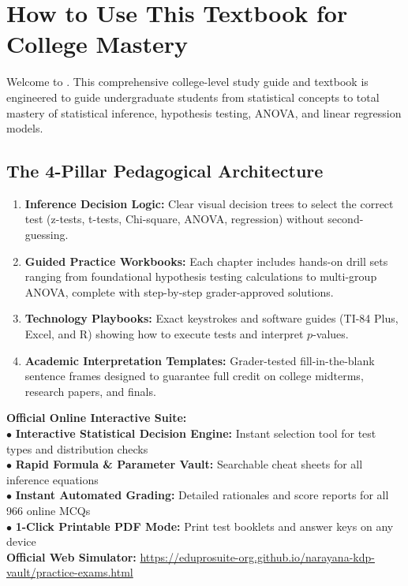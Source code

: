 \tableofcontents
\clearpage

\chapter*{How to Use This Textbook for College Mastery}

Welcome to \textbf{\BookTitle}. This comprehensive college-level study guide and textbook is engineered to guide undergraduate students from statistical concepts to total mastery of statistical inference, hypothesis testing, ANOVA, and linear regression models.

\section*{The 4-Pillar Pedagogical Architecture}
\begin{enumerate}[leftmargin=1.5em]
  \item \textbf{Inference Decision Logic:} Clear visual decision trees to select the correct test (z-tests, t-tests, Chi-square, ANOVA, regression) without second-guessing.
  \item \textbf{Guided Practice Workbooks:} Each chapter includes hands-on drill sets ranging from foundational hypothesis testing calculations to multi-group ANOVA, complete with step-by-step grader-approved solutions.
  \item \textbf{Technology Playbooks:} Exact keystrokes and software guides (TI-84 Plus, Excel, and R) showing how to execute tests and interpret $p$-values.
  \item \textbf{Academic Interpretation Templates:} Grader-tested fill-in-the-blank sentence frames designed to guarantee full credit on college midterms, research papers, and finals.
\end{enumerate}

\begin{center}
\begin{tcolorbox}[standard jigsaw,width=0.95\linewidth,colback=NavyBlue!5!white,colframe=NavyBlue,title=\textbf{FREE DIGITAL WEB COMPANION \& PRACTICE PORTAL}]
\begin{minipage}{0.95\linewidth}
  \textbf{Official Online Interactive Suite:}\\
  $\bullet$ \textbf{Interactive Statistical Decision Engine:} Instant selection tool for test types and distribution checks\\
  $\bullet$ \textbf{Rapid Formula \& Parameter Vault:} Searchable cheat sheets for all inference equations\\
  $\bullet$ \textbf{Instant Automated Grading:} Detailed rationales and score reports for all 966 online MCQs\\
  $\bullet$ \textbf{1-Click Printable PDF Mode:} Print test booklets and answer keys on any device\\[6pt]
  \textbf{Official Web Simulator:} \url{https://eduprosuite-org.github.io/narayana-kdp-vault/practice-exams.html}
\end{minipage}
\end{tcolorbox}
\end{center}

